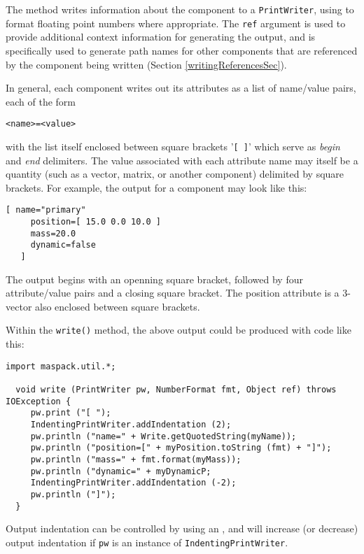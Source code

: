 \documentclass{article}
\begin{document}
The  method writes
information about the component to a {\tt PrintWriter}, using
 to format floating point
numbers where appropriate. The {\tt ref} argument is used to provide
additional context information for generating the output, and is
specifically used to generate path names for other components
that are referenced by the component being written
(Section \ref{writingReferencesSec}).

In general, each component writes out its attributes as a list
of name/value pairs, each of the form
\begin{lstlisting}[]
  <name>=<value>
\end{lstlisting}
with the list itself enclosed between square brackets '{\tt [ ]}' which
serve as {\it begin} and {\it end} delimiters. The value associated with each
attribute name may itself be a quantity (such as a vector, matrix, or
another component) delimited by square brackets. For example, the
output for a  component
may look like this:
\begin{lstlisting}[]
   [ name="primary"
     position=[ 15.0 0.0 10.0 ]
     mass=20.0
     dynamic=false
   ]
\end{lstlisting}
The output begins with an openning square bracket, followed by four
attribute/value pairs and a closing square bracket. The position
attribute is a 3-vector also enclosed between square brackets.

Within the {\tt write()} method, the above output could be produced
with code like this:
\begin{lstlisting}[]
  import maspack.util.*;

  void write (PrintWriter pw, NumberFormat fmt, Object ref) throws IOException {
     pw.print ("[ ");
     IndentingPrintWriter.addIndentation (2); 
     pw.println ("name=" + Write.getQuotedString(myName));
     pw.println ("position=[" + myPosition.toString (fmt) + "]");
     pw.println ("mass=" + fmt.format(myMass));
     pw.println ("dynamic=" + myDynamicP;
     IndentingPrintWriter.addIndentation (-2);
     pw.println ("]");
  }
\end{lstlisting}
Output indentation can be controlled by using an
, and
will increase (or decrease) output indentation if
{\tt pw} is an instance of {\tt IndentingPrintWriter}.
\end{document}
